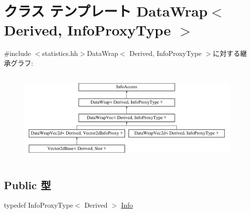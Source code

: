\hypertarget{classStats_1_1DataWrap}{
\section{クラス テンプレート DataWrap$<$ Derived, InfoProxyType $>$}
\label{classStats_1_1DataWrap}
}


{\ttfamily \#include $<$statistics.hh$>$}DataWrap$<$ Derived, InfoProxyType $>$に対する継承グラフ:\begin{figure}[H]
\begin{center}
\leavevmode
\includegraphics[height=4.7138cm]{classStats_1_1DataWrap}
\end{center}
\end{figure}
\subsection*{Public 型}
\begin{DoxyCompactItemize}
\item 
typedef InfoProxyType$<$ Derived $>$ \hyperlink{classStats_1_1DataWrap_a76d2c248839f34168d2a3760bc1fbdb9}{Info}
\end{DoxyCompactItemize}
